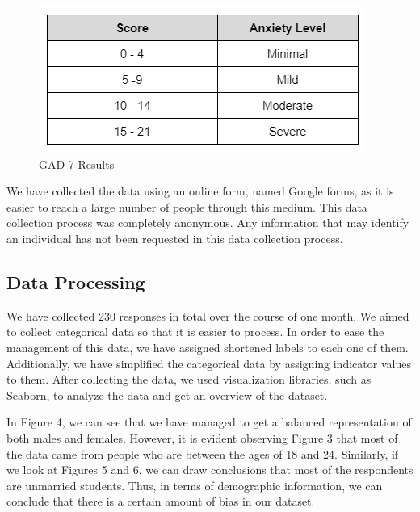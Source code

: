 \documentclass[12pt, english]{article}
\begin{document}
\begin{figure}[H]
\includegraphics{GAD7_grade.png}
\centering
\caption{GAD-7 Results}
\end{figure}

We have collected the data using an online form, named Google forms, as it is easier to reach a large number of people through this medium. This data collection process was completely anonymous. Any information that may identify an individual has not been requested in this data collection process. 

\subsection{Data Processing}
We have collected 230 responses in total over the course of one month. We aimed to collect categorical data so that it is easier to process. In order to ease the management of this data, we have assigned shortened labels to each one of them. Additionally, we have simplified the categorical data by assigning indicator values to them. After collecting the data, we used visualization libraries, such as Seaborn, to analyze the data and get an overview of the dataset. 

In Figure 4, we can see that we have managed to get a balanced representation of both males and females. However, it is evident observing Figure 3 that most of the data came from people who are between the ages of 18 and 24. Similarly, if we look at Figures 5 and 6, we can draw conclusions that most of the respondents are unmarried students. Thus, in terms of demographic information, we can conclude that there is a certain amount of bias in our dataset. 
\end{document}
